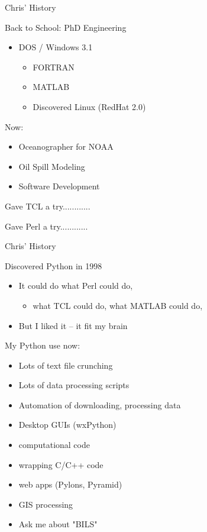 \documentclass{beamer}
\begin{document}
      

\begin{frame}{Chris' History}

    {\Large Back to School: PhD Engineering }
    \begin{itemize}
      \item     DOS / Windows 3.1
      \begin{itemize}
        \item  FORTRAN
        \item  MATLAB
        \item   Discovered Linux (RedHat 2.0)
      \end{itemize}
    \end{itemize}

   \vspace{0.25in}
     
    \pause 
    {\Large Now: }
    \begin{itemize}
       \item Oceanographer for NOAA
       \item Oil Spill Modeling
       \item Software Development
    \end{itemize}

    \pause 
    \vspace{0.25in}
    {\Large Gave TCL a try............ }
    
    \pause 
    \vspace{0.25in}
    {\Large Gave Perl a try............}

\end{frame}

\begin{frame}{Chris' History}
    
{\Large Discovered Python in 1998}
\begin{itemize}
    \item It could do what Perl could do,
    \begin{itemize}
        \item what TCL could do, what MATLAB could do,
    \end{itemize}
    \item But I liked it -- it fit my brain
\end{itemize}

\vspace{0.1in}

{\Large     My Python use now:}
\begin{itemize}
   \item Lots of text file crunching
   \item Lots of data processing scripts 
   \item Automation of downloading, processing data
   \item Desktop GUIs (wxPython)
   \item computational code
   \item wrapping C/C++ code      
   \item web apps (Pylons, Pyramid)
   \item GIS processing
   \item Ask me about "BILS" 
\end{itemize}
\end{frame}
\end{document}
